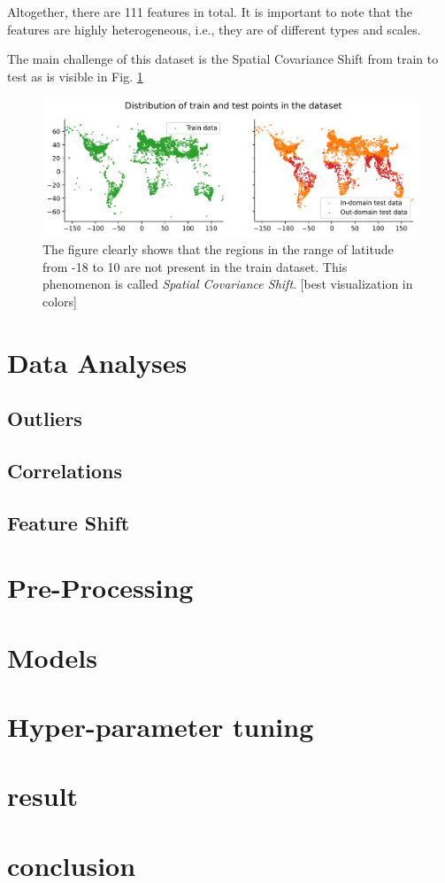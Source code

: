 \documentclass[letterpaper, 10 pt, conference]{ieeeconf}
\begin{document}
    Altogether, there are 111 features in total. It is important to note that the features are highly heterogeneous, i.e., they are of different types and scales.

    The main challenge of this dataset is the Spatial Covariance Shift from train to test as is visible in Fig. \ref{fig:train-test-diff}

    \begin{figure}
        \centering
        \includegraphics[width=\linewidth]{challenge1/assets/train-test-diff.png}
        \caption{The figure clearly shows that the regions in the range of latitude from -18 to 10 are not present in the train dataset. This phenomenon is called \textit{Spatial Covariance Shift}. [best visualization in colors] }
        \label{fig:train-test-diff}
    \end{figure}

    \section{Data Analyses}
    
    \subsection{Outliers}
    \subsection{Correlations}
    \subsection{Feature Shift}
    
    
    \section{Pre-Processing}
    
    \section{Models}
    
    \section{Hyper-parameter tuning}
    
    \section{result}
    
    \section{conclusion}
\end{document}
